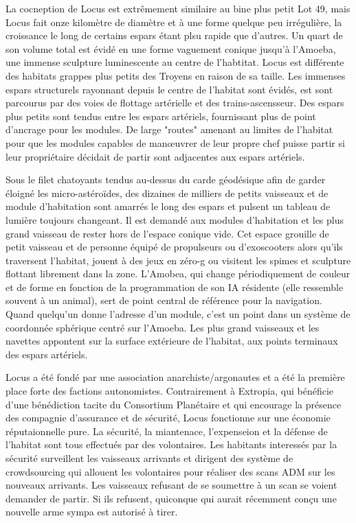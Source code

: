                                                                La cocneption de Locus est extrêmement similaire au bine plus petit Lot 49, mais Locus fait onze kilomètre de diamètre et à une forme quelque peu irrégulière, la croissance le long de certains espars étant plsu rapide que d'autres. Un quart de son volume total est évidé en une forme vaguement conique jusqu'à l'Amoeba, une immense sculpture luminescente au centre de l'habtitat. Locus est différente des habitats grappes plus petits des Troyens en raison de sa taille. Les immenses espars structurels rayonnant depuis le centre de l'habitat sont évidés, est sont parcourus par des voies de flottage artérielle et des trains-ascensseur. Des espars plus petits sont tendus entre les espars artériels, fournissant plus de point d'ancrage pour les modules. De large "routes" amenant au limites de l'habitat pour que les modules capables de manœuvrer de leur propre chef puisse partir si leur propriétaire décidait de partir sont adjacentes aux espars artériels. 

                                                               Sous le  filet chatoyants tendus au-dessus du carde géodésique afin de garder éloigné les micro-astéroïdes, des dizaines de milliers de petits vaisseaux et de module d'habitation sont amarrés le long des espars et pulsent un tableau de lumière toujours changeant. Il est demandé aux modules d'habitation et les plus grand vaisseau de rester hors de l'espace conique vide. Cet espace grouille de petit vaisseau et de personne équipé de propulseurs ou d'exoscooters alors qu'ils traversent l'habitat, jouent à des jeux en zéro-g ou visitent les spimes et sculpture flottant librement dans la zone. L'Amobea, qui change périodiquement de couleur et de forme en fonction de la programmation de son IA résidente (elle ressemble souvent à un animal), sert de point central de référence pour la navigation. Quand quelqu'un donne l'adresse d'un module, c'est un point dans un système de coordonnée sphérique centré sur l'Amoeba. Les plus grand vaisseaux et les navettes appontent sur la surface extérieure de l'habitat, aux points terminaux des espars artériels. 

                                                               Locus a été fondé par une association anarchiste/argonautes et a été la première place forte des factions autonomistes. Contrairement à Extropia, qui bénéficie d'une bénédiction tacite du Consortium Planétaire et qui encourage la présence des compagnie d'assurance et de sécurité, Locus fonctionne sur une économie réputaionnelle pure. La sécurité, la miantenace, l'expenseion et la défense de l'habitat sont tous effectués par des volontaires. Les habitants interessés par la sécurité surveillent les vaisseaux arrivants et dirigent des système de crowdsourcing qui allouent les volontaires pour réaliser des scans ADM sur les nouveaux arrivants. Les vaisseaux refusant de se soumettre à un scan se voient demander de partir. Si ils refusent, quiconque qui aurait récemment conçu une nouvelle arme sympa est autorisé à tirer. 

